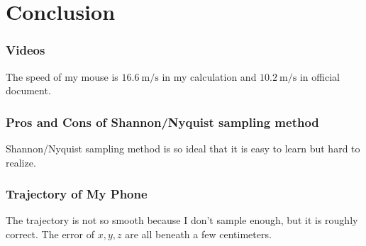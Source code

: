 \documentclass{article}
\begin{document}
\section{Conclusion}
\subsubsection*{Videos}
The speed of my mouse is $16.6 ~\mathrm{m/s}$ in my calculation and $10.2 ~\mathrm{m/s}$ in official document.
\subsubsection*{Pros and Cons of Shannon/Nyquist sampling method}
Shannon/Nyquist sampling method is so ideal that it is easy to learn but hard to realize.
\subsubsection*{Trajectory of My Phone}
The trajectory is not so smooth because I don't sample enough, but it is roughly correct. The error of $x, y, z$ are all beneath a few centimeters.


\end{document}
